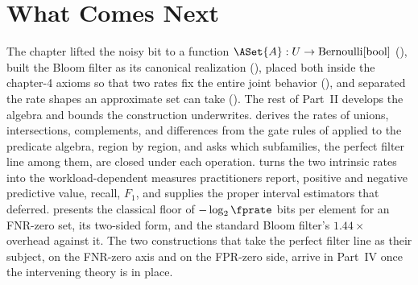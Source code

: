 %

\section{What Comes Next}
\label{sec:ch5-what-comes-next}

The chapter lifted the noisy bit to a function $\ASet{A} : \Universe \to
\Bernoulli{\BoolType}$ (), built the Bloom filter
as its canonical realization (), placed both
inside the chapter-4 axioms so that two rates fix the entire joint behavior
(), and separated the rate shapes an approximate
set can take (). The rest of Part~II develops
the algebra and bounds the construction underwrites.
 derives the rates of unions, intersections,
complements, and differences from the gate rules of
 applied to the predicate algebra, region by region,
and asks which subfamilies, the perfect filter line among them, are closed
under each operation.  turns the two intrinsic
rates into the workload-dependent measures practitioners report, positive
and negative predictive value, recall, $F_1$, and supplies the proper
interval estimators that  deferred.
 presents the classical floor of $-\log_2
\fprate$ bits per element for an FNR-zero set, its two-sided form, and the
standard Bloom filter's $1.44\times$ overhead against it. The two
constructions that take the perfect filter line as their subject,
 on the FNR-zero axis and
 on the FPR-zero side, arrive in Part~IV once
the intervening theory is in place.
